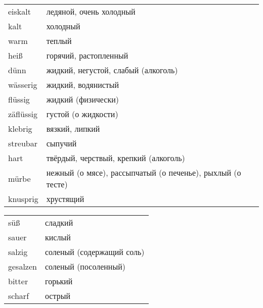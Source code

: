 
 \\
 \\
 \\
 \\


\begin{longtable}{|l|l|}
\hline\endhead
\hline\endfoot
eiskalt & ледяной, очень холодный \\
kalt & холодный \\
warm & теплый \\
hei\ss & горячий, растопленный \\
\hline
d\"unn & жидкий, негустой, слабый (алкоголь) \\
w\"asserig & жидкий, водянистый \\
fl\"ussig & жидкий (физически) \\
z\"afl\"ussig & густой (о жидкости) \\
klebrig & вязкий, липкий \\
streubar & сыпучий \\
hart & твёрдый, черствый, крепкий (алкоголь) \\
m\"urbe & нежный (о мясе), рассыпчатый (о печенье), рыхлый (о тесте) \\
knusprig & хрустящий
\end{longtable}



\begin{longtable}{|l|l|}
\hline\endhead
\hline\endfoot
s\"u\ss & сладкий \\
sauer & кислый \\
salzig & соленый (содержащий соль) \\
gesalzen & соленый (посоленный) \\
bitter & горький \\
scharf & острый
\end{longtable}



